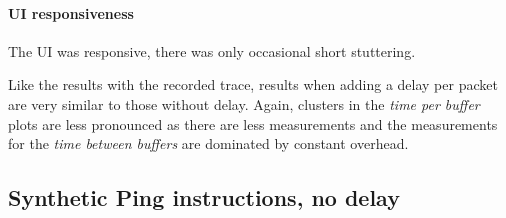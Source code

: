 \paragraph{UI responsiveness}

The UI was responsive, there was only occasional short stuttering.
\bigbreak

Like the results with the recorded trace, results when adding a delay per packet are very similar to
those without delay. Again, clusters in the \textit{time per buffer} plots are less pronounced as
there are less measurements and the measurements for the \textit{time between buffers} are dominated
by constant overhead.

\subsection{Synthetic Ping instructions, no delay}
\label{evaluation/results/synthetic-ping-instructions-no-delay}

